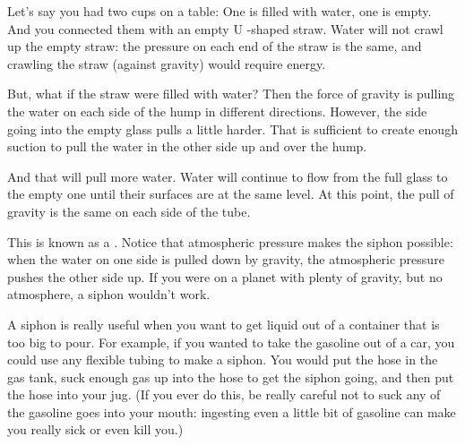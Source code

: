 Let's say you had two cups on a table: One is filled with water,  one is empty.  And you connected them with an empty U -shaped straw.  Water will not crawl up the empty straw:  the pressure on each end of the straw is the same, and crawling the straw (against gravity) would require energy.

But, what if the straw were filled with water?  Then the force of gravity is pulling the water on each side of the hump in different directions.   However,  the side going into the empty glass pulls a little harder.  That is sufficient to create enough suction to pull the  water in the other side up and over the hump.

And that will pull more water.    Water will continue to flow from the full glass to the empty one until their surfaces are at the same level.  At this point,  the pull of gravity is the same on each side of the tube.

This is known as a .   Notice that atmospheric pressure makes the siphon possible:  when the water on one side is pulled down by gravity,  the atmospheric pressure pushes the other side up.  If you were on a planet with plenty of gravity,  but no atmosphere,  a siphon wouldn't work.

A siphon is really useful when you want to get liquid out of a container that is too big to pour.   For 
example, if you wanted to take the gasoline out of a car,  you could use any flexible tubing to make a siphon.  You would put the hose in the gas tank,  suck enough gas up into the hose to get the siphon going,  and then put the hose into your jug.  (If you ever do this,  be really careful not to suck any of the gasoline goes into your mouth: ingesting even a little bit of gasoline can make you really sick or even kill you.)

